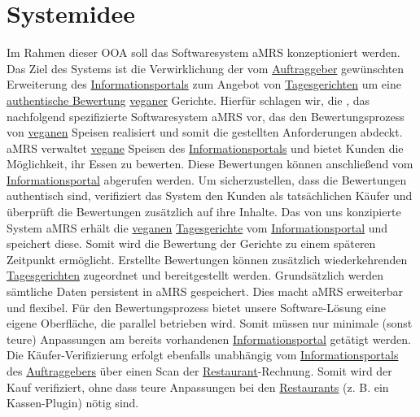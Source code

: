\section{Systemidee}

Im Rahmen dieser \ac{OOA} soll das Softwaresystem \ac{aMRS} konzeptioniert werden.
\newparagraph
Das Ziel des Systems ist die Verwirklichung der vom \hyperref[gls:auftraggeber]{Auftraggeber} gewünschten Erweiterung des \hyperref[gls:informationsportal]{Informationsportals} zum Angebot von \hyperref[gls:tagesgericht]{Tagesgerichten} um eine \hyperref[gls:authentischeBewertung]{authentische Bewertung} \hyperref[gls:vegan]{veganer} Gerichte.
Hierfür schlagen wir, die \vFKW, das nachfolgend spezifizierte Softwaresystem \ac{aMRS} vor, das den Bewertungsprozess von \hyperref[gls:vegan]{veganen} Speisen realisiert und somit die gestellten Anforderungen abdeckt.
\ac{aMRS} verwaltet \hyperref[gls:vegan]{vegane} Speisen des \hyperref[gls:informationsportal]{Informationsportals} und bietet Kunden die Möglichkeit, ihr Essen zu bewerten.
Diese Bewertungen können anschließend vom \hyperref[gls:informationsportal]{Informationsportal} abgerufen werden.
Um sicherzustellen, dass die Bewertungen authentisch sind, verifiziert das System den Kunden als tatsächlichen Käufer und überprüft die Bewertungen zusätzlich auf ihre Inhalte.
\newparagraph
Das von uns konzipierte System \ac{aMRS} erhält die \hyperref[gls:vegan]{veganen} \hyperref[gls:tagesgericht]{Tagesgerichte} vom \hyperref[gls:informationsportal]{Informationsportal} und speichert diese.
Somit wird die Bewertung der Gerichte zu einem späteren Zeitpunkt ermöglicht.
Erstellte Bewertungen können zusätzlich wiederkehrenden \hyperref[gls:tagesgericht]{Tagesgerichten} zugeordnet und bereitgestellt werden. Grundsätzlich werden sämtliche Daten persistent in \ac{aMRS} gespeichert.
Dies macht \ac{aMRS} erweiterbar und flexibel.
\newparagraph
Für den Bewertungsprozess bietet unsere Software-Lösung eine eigene Oberfläche, die parallel betrieben wird.
Somit müssen nur minimale (sonst teure) Anpassungen am bereits vorhandenen \hyperref[gls:informationsportal]{Informationsportal} getätigt werden.
Die Käufer-Verifizierung erfolgt ebenfalls unabhängig vom \hyperref[gls:informationsportal]{Informationsportals} des \hyperref[gls:auftraggeber]{Auftraggebers} über einen Scan der \hyperref[gls:restaurant]{Restaurant}-Rechnung.
Somit wird der Kauf verifiziert, ohne dass teure Anpassungen bei den \hyperref[gls:restaurant]{Restaurants} (z. B. ein Kassen-Plugin) nötig sind.


